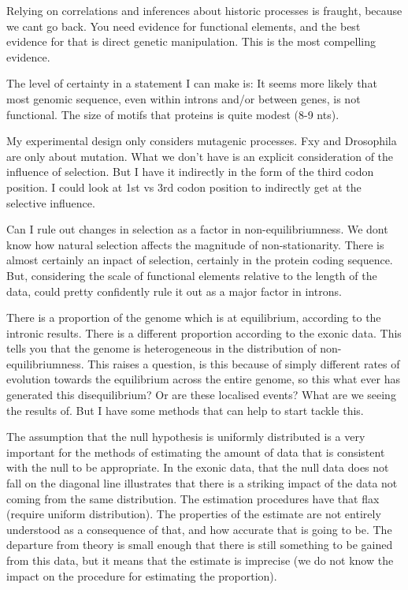 Relying on correlations and inferences about historic processes is fraught, because we cant go back. You need evidence for functional elements, and the best evidence for that is direct genetic manipulation. This is the most compelling evidence.

The level of certainty in a statement I can make is:
It seems more likely that most genomic sequence, even within introns and/or between genes, is not functional. The size of motifs that proteins is quite modest (8-9 nts). 

My experimental design only considers mutagenic processes. Fxy and Drosophila are only about mutation. What we don't have is an explicit consideration of the influence of selection. But I have it indirectly in the form of the third codon position. I could look at 1st vs 3rd codon position to indirectly get at the selective influence. 

Can I rule out changes in selection as a factor in non-equilibriumness. We dont know how natural selection affects the magnitude of non-stationarity. There is almost certainly an inpact of selection, certainly in the protein coding sequence. But, considering the scale of functional elements relative to the length of the data, could pretty confidently rule it out as a major factor in introns. 


There is a proportion of the genome which is at equilibrium, according to the intronic results. There is a different proportion according to the exonic data. This tells you that the genome is heterogeneous in the distribution of non-equilibriumness. This raises a question, is this because of simply different rates of evolution towards the equilibrium across the entire genome, so this what ever has generated this disequilibrium? Or are these localised events? What are we seeing the results of. But I have some methods that can help to start tackle this. 


The assumption that the null hypothesis is uniformly distributed is a very important for the methods of estimating the amount of data that is consistent with the null to be appropriate. In the exonic data, that the null data does not fall on the diagonal line illustrates that there is a striking impact of the data not coming from the same distribution. The estimation procedures have that flax (require uniform distribution). The properties of the estimate are not entirely understood as a consequence of that, and how accurate that is going to be. The departure from theory is small enough that there is still something to be gained from this data, but it means that the estimate is imprecise (we do not know the impact on the procedure for estimating the proportion). 

